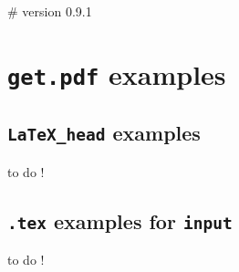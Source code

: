 # version 0.9.1
\section{\texttt{get.pdf} examples}
\label{getpdf_examples}

\subsection{\texttt{LaTeX\_head} examples}

to do !

\subsection{\texttt{.tex} examples for \texttt{input}}

to do !



